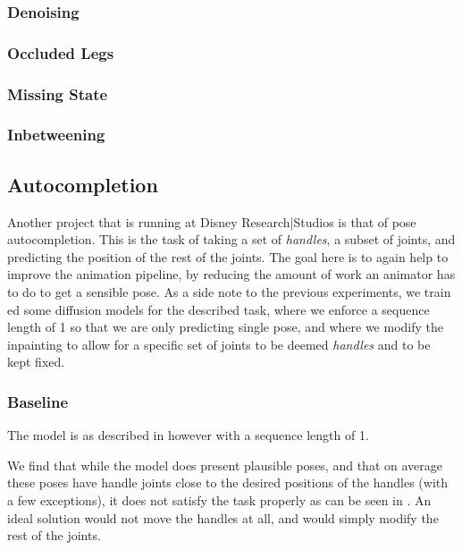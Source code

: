 \subsubsection{Denoising}
\subsubsection{Occluded Legs}
\subsubsection{Missing State}
\subsubsection{Inbetweening}


\subsection{Autocompletion}

Another project that is running at Disney Research|Studios is that of pose autocompletion. This is the task of taking a set of \textit{handles}, a subset of joints, and predicting the position of the rest of the joints. The goal here is to again help to improve the animation pipeline, by reducing the amount of work an animator has to do to get a sensible pose. As a side note to the previous experiments, we train
ed some diffusion models for the described task, where we enforce a sequence length of 1 so that we are only predicting  single pose, and where we modify the inpainting to allow for a specific set of joints to be deemed \textit{handles} and to be kept fixed.

\subsubsection{Baseline}
The model is as described in  however with a sequence length of 1.

We find that while the model does present plausible poses, and that on average these poses have handle joints close to the desired positions of the handles (with a few exceptions), it does not satisfy the task properly as can be seen in . An ideal solution would not move the handles at all, and would simply modify the rest of the joints.

